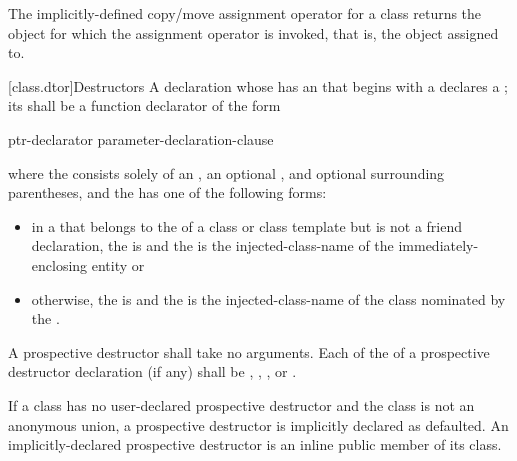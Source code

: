 \pnum
The implicitly-defined copy/move assignment operator for a class
returns the object for which the assignment operator is invoked,
that is, the object assigned to.

[class.dtor]{Destructors}%
%
%
\pnum
A declaration whose 
has an  that begins with a \tcode{\~}
declares a ;
its  shall be a function declarator of the form
\begin{ncbnf}
ptr-declarator \terminal{(} parameter-declaration-clause \terminal{)}  
\end{ncbnf}
where the  consists solely of an
, an optional ,
and optional surrounding parentheses, and the  has
one of the following forms:
\begin{itemize}
\item
in a  that belongs to the
 of a class or class template
but is not a friend
declaration, the  is
\tcode{\~} and the  is the
injected-class-name of the immediately-enclosing entity or

\item
otherwise, the
 is 
\tcode{\~} and the 
is the injected-class-name of the
class nominated by the .
\end{itemize}

A prospective destructor shall take no arguments.
Each  of the 
of a prospective destructor declaration (if any)
shall be
,
,
, or
.

\pnum
{}%
%
If a class has no user-declared
prospective destructor
and the class is not an anonymous union,
a prospective destructor is implicitly
declared as defaulted.
An implicitly-declared prospective destructor is an
inline public member of its class.

